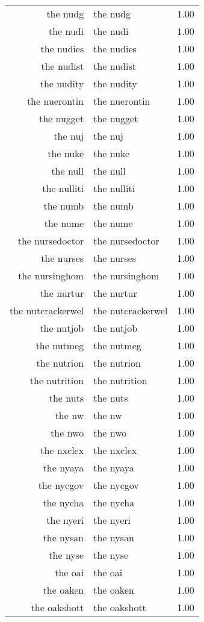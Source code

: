 \begin{table}[ht]
\begin{tabular}{rlr}
  the nudg & the nudg & 1.00 \\ 
  the nudi & the nudi & 1.00 \\ 
  the nudies & the nudies & 1.00 \\ 
  the nudist & the nudist & 1.00 \\ 
  the nudity & the nudity & 1.00 \\ 
  the nuerontin & the nuerontin & 1.00 \\ 
  the nugget & the nugget & 1.00 \\ 
  the nuj & the nuj & 1.00 \\ 
  the nuke & the nuke & 1.00 \\ 
  the null & the null & 1.00 \\ 
  the nulliti & the nulliti & 1.00 \\ 
  the numb & the numb & 1.00 \\ 
  the nume & the nume & 1.00 \\ 
  the nursedoctor & the nursedoctor & 1.00 \\ 
  the nurses & the nurses & 1.00 \\ 
  the nursinghom & the nursinghom & 1.00 \\ 
  the nurtur & the nurtur & 1.00 \\ 
  the nutcrackerwel & the nutcrackerwel & 1.00 \\ 
  the nutjob & the nutjob & 1.00 \\ 
  the nutmeg & the nutmeg & 1.00 \\ 
  the nutrion & the nutrion & 1.00 \\ 
  the nutrition & the nutrition & 1.00 \\ 
  the nuts & the nuts & 1.00 \\ 
  the nw & the nw & 1.00 \\ 
  the nwo & the nwo & 1.00 \\ 
  the nxclex & the nxclex & 1.00 \\ 
  the nyaya & the nyaya & 1.00 \\ 
  the nycgov & the nycgov & 1.00 \\ 
  the nycha & the nycha & 1.00 \\ 
  the nyeri & the nyeri & 1.00 \\ 
  the nysan & the nysan & 1.00 \\ 
  the nyse & the nyse & 1.00 \\ 
  the oai & the oai & 1.00 \\ 
  the oaken & the oaken & 1.00 \\ 
  the oakshott & the oakshott & 1.00 \\ 

\end{tabular}
\end{table}
